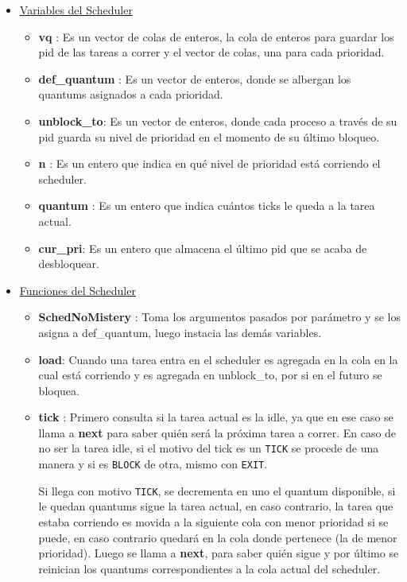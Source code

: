 	\begin{itemize}
		\item \underline{Variables del Scheduler}
			\begin{itemize}
				\item \textbf{vq} : Es un vector de colas de enteros, la cola de enteros para guardar los pid de las tareas a correr y el vector de colas, una para cada prioridad.
				\item \textbf{def\_quantum} : Es un vector de enteros, donde se
					albergan los quantums asignados a cada prioridad.
				\item \textbf{unblock\_to}: Es un vector de enteros, donde cada proceso a través de su pid guarda su nivel de prioridad en el momento de su último bloqueo.
				\item \textbf{n} : Es un entero que indica en qué nivel de
					prioridad está corriendo el scheduler.
				\item \textbf{quantum} : Es un entero que indica cuántos ticks
					le queda a la tarea actual.
				\item \textbf{cur\_pri}: Es un entero que almacena el último pid que se acaba de desbloquear.
			\end{itemize}
		\item \underline{Funciones del Scheduler}
			\begin{itemize}
				\item \textbf{SchedNoMistery} : Toma los argumentos pasados por
					parámetro y se los asigna a def\_quantum, luego instacia las
					demás variables.
				\item \textbf{load}: Cuando una tarea entra en el scheduler es agregada en la cola en la cual está corriendo y es agregada en unblock\_to, por si en el futuro se bloquea.
				\item \textbf{tick} : Primero consulta si la tarea actual es la idle, ya que en ese caso se llama a \textbf{next} para saber quién será la próxima tarea a correr. En caso de no ser la tarea idle, si el motivo del tick es un \texttt{TICK} se procede de una
				manera y si es \texttt{BLOCK} de otra, mismo con \texttt{EXIT}.
				
				Si llega con motivo \texttt{TICK}, se decrementa en uno el
					quantum disponible, si le quedan quantums sigue la tarea
					actual, en caso contrario, la tarea que estaba corriendo es
					movida a la siguiente cola con menor prioridad si se puede,
					en caso contrario quedará en la cola donde pertenece (la de
					menor prioridad). Luego se llama a \textbf{next}, para saber
					quién sigue y por último se reinician los quantums correspondientes a la cola actual del scheduler.
				

\end{itemize}
\end{itemize}
